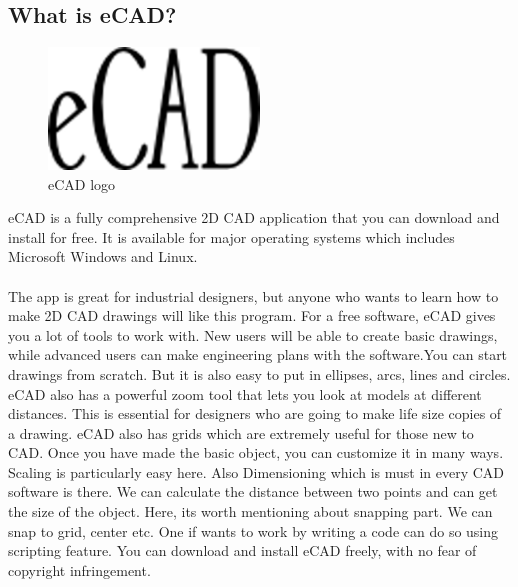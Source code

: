 \subsection{What is eCAD?}
\begin{figure}[h!]
\centering
\includegraphics[width=0.5\textwidth]{images/logo.png}
\caption{eCAD logo}
\end{figure}
eCAD is a fully comprehensive 2D CAD application that you can download and install for free. It is available for major operating systems which includes Microsoft Windows and Linux. \\\\
The app is great for industrial designers, but anyone who wants to learn how to make 2D
CAD drawings will like this program. For a free software, eCAD gives you a lot of tools
to work with. New users will be able to create basic drawings, while advanced users can
make engineering plans with the software.You can start drawings from scratch. But it is
also easy to put in ellipses, arcs, lines and circles. eCAD also has a powerful zoom tool
that lets you look at models at different distances. This is essential for designers who
are going to make life size copies of a drawing. eCAD also has grids which are extremely
useful for those new to CAD. Once you have made the basic object, you can customize
it in many ways. Scaling is particularly easy here. Also Dimensioning which is must in
every CAD software is there. We can calculate the distance between two points and can
get the size of the object. Here, its worth mentioning about snapping part. We can
snap to grid, center etc. One if wants to work by writing a code can do so using scripting
feature. You can download and install eCAD freely, with no fear of copyright infringement.\\\\


